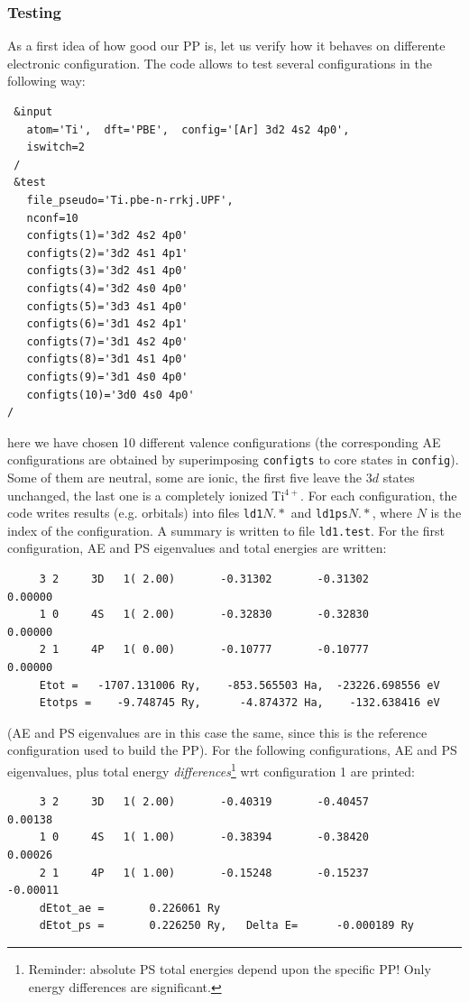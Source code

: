 \documentclass[12pt,a4paper]{article}
\begin{document}
\subsubsection{Testing}

As a first idea of how good our PP is, let us verify how it
behaves on differente electronic configuration. The code
allows to test several configurations in the following way:
\begin{verbatim}
 &input
   atom='Ti',  dft='PBE',  config='[Ar] 3d2 4s2 4p0',
   iswitch=2
 /
 &test
   file_pseudo='Ti.pbe-n-rrkj.UPF',
   nconf=10
   configts(1)='3d2 4s2 4p0'
   configts(2)='3d2 4s1 4p1'
   configts(3)='3d2 4s1 4p0'
   configts(4)='3d2 4s0 4p0'
   configts(5)='3d3 4s1 4p0'
   configts(6)='3d1 4s2 4p1'
   configts(7)='3d1 4s2 4p0'
   configts(8)='3d1 4s1 4p0'
   configts(9)='3d1 4s0 4p0'
   configts(10)='3d0 4s0 4p0'
/
\end{verbatim}
here we have chosen 10 different valence configurations 
(the corresponding AE configurations are obtained by 
superimposing \texttt{configts} to core states in \texttt{config}).
Some of them are neutral, some are ionic, the first five leave
the $3d$ states unchanged, the last one is a completely ionized
Ti$^{4+}$. For each configuration, the code writes results 
(e.g. orbitals) into files \texttt{ld1}$N.*$ and \texttt{ld1ps}$N.*$,
where $N$ is the index of the configuration. A summary is written to
file \texttt{ld1.test}. For the first configuration, AE and PS 
eigenvalues and total energies are written:
\begin{verbatim}
     3 2     3D   1( 2.00)       -0.31302       -0.31302        0.00000
     1 0     4S   1( 2.00)       -0.32830       -0.32830        0.00000
     2 1     4P   1( 0.00)       -0.10777       -0.10777        0.00000
     Etot =   -1707.131006 Ry,    -853.565503 Ha,  -23226.698556 eV
     Etotps =    -9.748745 Ry,      -4.874372 Ha,    -132.638416 eV
\end{verbatim}
(AE and PS eigenvalues are in this case the same, since this is the
reference configuration used to build the PP). For the following
configurations, AE and PS eigenvalues, plus total energy
{\em differences}\footnote{Reminder: absolute PS total energies 
depend upon the specific PP! Only energy differences are significant.}
wrt configuration 1 are printed:
\begin{verbatim}
     3 2     3D   1( 2.00)       -0.40319       -0.40457        0.00138
     1 0     4S   1( 1.00)       -0.38394       -0.38420        0.00026
     2 1     4P   1( 1.00)       -0.15248       -0.15237       -0.00011
     dEtot_ae =       0.226061 Ry
     dEtot_ps =       0.226250 Ry,   Delta E=      -0.000189 Ry
\end{verbatim}
\end{document}
